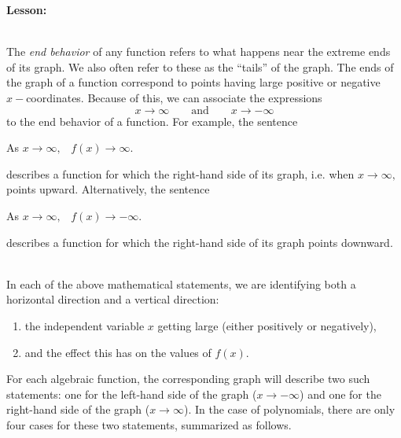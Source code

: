 \documentclass[12pt]{article}
\theoremstyle{definition}
\begin{document}
{\bf Lesson:}\\
\ \par
The {\it end behavior} of any function refers to what happens near the extreme ends of its graph.  We also often refer to these as the ``tails'' of the graph.  The ends of the graph of a function correspond to points having large positive or negative $x-$coordinates.  Because of this, we can associate the expressions
$$x\rightarrow\infty\qquad\text{and}\qquad x\rightarrow -\infty$$
to the end behavior of a function.  For example, the sentence
\begin{center}
As $x\rightarrow\infty,$ \ $f(x)\rightarrow\infty$.
\end{center}
describes a function for which the right-hand side of its graph, i.e. when $x\rightarrow\infty,$ points upward.  Alternatively, the sentence  
\begin{center}
As $x\rightarrow\infty,$ \ $f(x)\rightarrow -\infty$.
\end{center}
describes a function for which the right-hand side of its graph points downward.\\
\ \par
In each of the above mathematical statements, we are identifying both a horizontal direction and a vertical direction:
\begin{enumerate}
	\item  the independent variable $x$ getting large (either positively or negatively),
	\item and the effect this has on the values of $f(x)$.
\end{enumerate}
\newpage
For each algebraic function, the corresponding graph will describe two such statements: one for the left-hand side of the graph ($x\rightarrow -\infty$) and one for the right-hand side of the graph ($x\rightarrow\infty$).
In the case of polynomials, there are only four cases for these two statements, summarized as follows.\\
\ \par
\end{document}
